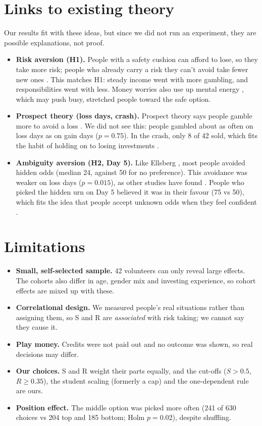 \documentclass[10pt,a4paper]{article}
\begin{document}
\section{Links to existing theory}

Our results fit with these ideas, but since we did not run an experiment, they are possible explanations, not proof.

\begin{itemize}
\item \textbf{Risk aversion (H1).} People with a safety cushion can afford to lose, so they take more risk; people who already carry a risk they can't avoid take fewer new ones \cite{gollier}. This matches H1: steady income went with more gambling, and responsibilities went with less. Money worries also use up mental energy \cite{mani}, which may push busy, stretched people toward the safe option.
\item \textbf{Prospect theory (loss days, crash).} Prospect theory says people gamble more to avoid a loss \cite{kt}. We did not see this: people gambled about as often on loss days as on gain days ($p = 0.75$). In the crash, only 8 of 42 sold, which fits the habit of holding on to losing investments \cite{shefrin}.
\item \textbf{Ambiguity aversion (H2, Day 5).} Like Ellsberg \cite{ellsberg}, most people avoided hidden odds (median 24, against 50 for no preference). This avoidance was weaker on loss days ($p = 0.015$), as other studies have found \cite{kocher}. People who picked the hidden urn on Day 5 believed it was in their favour (75 vs 50), which fits the idea that people accept unknown odds when they feel confident \cite{heath}.
\end{itemize}

\section{Limitations}

\begin{itemize}
\item \textbf{Small, self-selected sample.} 42 volunteers can only reveal large effects. The cohorts also differ in age, gender mix and investing experience, so cohort effects are mixed up with these.
\item \textbf{Correlational design.} We measured people's real situations rather than assigning them, so S and R are \emph{associated} with risk taking; we cannot say they cause it.
\item \textbf{Play money.} Credits were not paid out and no outcome was shown, so real decisions may differ.
\item \textbf{Our choices.} S and R weight their parts equally, and the cut-offs ($S>0.5$, $R \ge 0.35$), the student scaling (formerly a cap) and the one-dependent rule are ours.
\item \textbf{Position effect.} The middle option was picked more often (241 of 630 choices vs 204 top and 185 bottom; Holm $p = 0.02$), despite shuffling.
\end{itemize}
\end{document}
